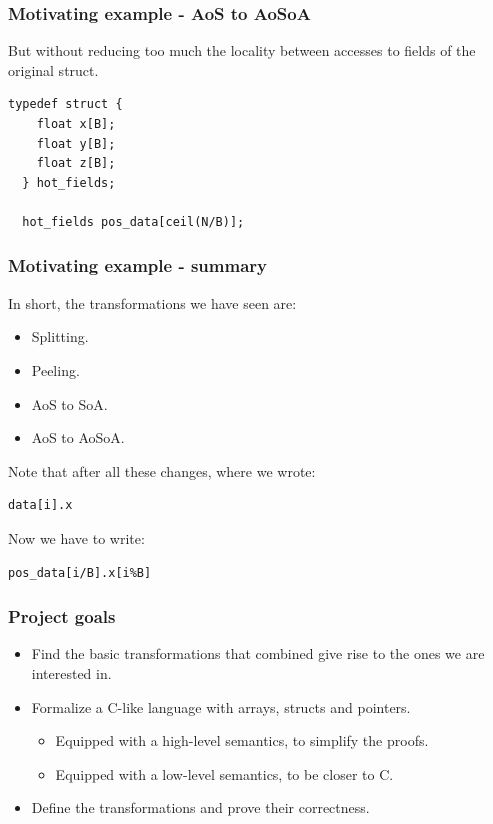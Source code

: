 \begin{frame}[fragile]
\frametitle{Motivating example - AoS to AoSoA}

But without reducing too much the locality between accesses to fields of the original struct.

\bigskip

\begin{lstlisting}[style=Cstyle]
  typedef struct {
    float x[B]; 
    float y[B];
    float z[B];
  } hot_fields;

  hot_fields pos_data[ceil(N/B)];
\end{lstlisting}

\end{frame}


\begin{frame}[fragile]
\frametitle{Motivating example - summary}

In short, the transformations we have seen are:
\begin{itemize}
	\item Splitting.
	\item Peeling.
	\item AoS to SoA.
	\item AoS to AoSoA.
\end{itemize}

\bigskip \pause

Note that after all these changes, where we wrote:

\begin{lstlisting}[style=Cstyle]
  data[i].x 
\end{lstlisting}

Now we have to write:

\begin{lstlisting}[style=Cstyle]
  pos_data[i/B].x[i%B]
\end{lstlisting}

\end{frame}


\begin{frame}[fragile]
\frametitle{Project goals}

\begin{itemize}
	\setlength\itemsep{1.5em}
	\item Find the basic transformations that combined give rise to the ones we are interested in.\\ \pause
	\item Formalize a C-like language with arrays, structs and pointers.
	\begin{itemize}
		\item Equipped with a high-level semantics, to simplify the proofs.
		\item Equipped with a low-level semantics, to be closer to C.
	\end{itemize} \pause
	\item Define the transformations and prove their correctness.
\end{itemize}

\end{frame}


